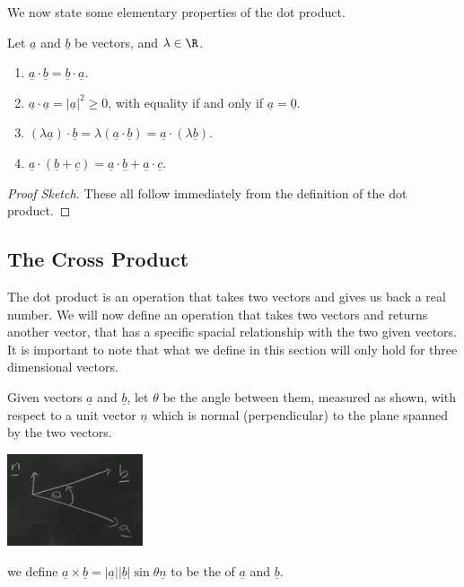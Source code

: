 \documentclass[a4]{scrartcl}
\begin{document}
We now state some elementary properties of the dot product.

\begin{proposition}
	Let $\underline{a}$ and $\underline{b}$ be vectors, and $\lambda \in \R$.
	\begin{enumerate}[label=(\roman*)]
		\item $\underline{a} \cdot \underline{b} = \underline{b} \cdot \underline{a}$.
		\item $\underline{a} \cdot \underline{a} = |\underline{a}|^2 \geq 0$, with equality if and only if $\underline{a} = \underline{0}$.
		\item $(\lambda \underline{a}) \cdot \underline{b} = \lambda ( \underline{a} \cdot \underline{b}) = \underline{a} \cdot (\lambda \underline{b})$.
		\item $\underline{a} \cdot (\underline{b} + \underline{c}) = \underline{a} \cdot \underline{b} + \underline{a} \cdot \underline{c}$.
	\end{enumerate}
\end{proposition}
\begin{proof}[Proof Sketch]
	These all follow immediately from the definition of the dot product.
\end{proof}

\subsection{The Cross Product}

The dot product is an operation that takes two vectors and gives us back a real number. We will now define an operation that takes two vectors and returns another vector, that has a specific spacial relationship with the two given vectors. It is important to note that what we define in this section will only hold for three dimensional vectors.

\begin{definition}
	Given vectors $\underline{a}$ and $\underline{b}$, let $\theta$ be the angle between them, measured as shown, with respect to a  unit vector $\underline{n}$ which is normal (perpendicular) to the plane spanned by the two vectors.
\begin{center}
	\includegraphics[width=0.3\textwidth]{cross-product-angle.png}
\end{center}
we define $\underline{a} \times \underline{b} = |\underline{a} | |\underline{b}| \sin \theta \underline{n}$ to be the  of $\underline{a}$ and $\underline{b}$.
\end{definition}
\end{document}
